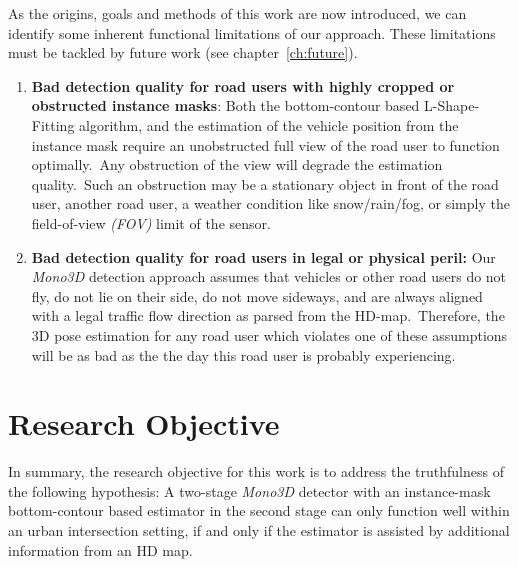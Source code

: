 As the origins, goals and methods of this work are now introduced, we can identify some inherent functional limitations of our approach.
These limitations must be tackled by future work (see chapter~\ref{ch:future}).

\begin{enumerate}
    \item \textbf{Bad detection quality for road users with highly cropped or obstructed instance masks}: Both the bottom-contour based L-Shape-Fitting algorithm, and the estimation of the vehicle position from the instance mask require an unobstructed full view of the road user to function optimally.\ Any obstruction of the view will degrade the estimation quality.\ Such an obstruction may be a stationary object in front of the road user, another road user, a weather condition like snow/rain/fog, or simply the field-of-view \textit{(FOV)} limit of the sensor.
    \item \textbf{Bad detection quality for road users in legal or physical peril:} Our \textit{Mono3D} detection approach assumes that vehicles or other road users do not fly, do not lie on their side, do not move sideways, and are always aligned with a legal traffic flow direction as parsed from the HD-map.\ Therefore, the 3D pose estimation for any road user which violates one of these assumptions will be as bad as the the day this road user is probably experiencing.
\end{enumerate}

\section{Research Objective}
\label{sec:objective}

In summary, the research objective for this work is to address the truthfulness of the following hypothesis: A two-stage \textit{Mono3D} detector with an instance-mask bottom-contour based estimator in the second stage can only function well within an urban intersection setting, if and only if the estimator is assisted by additional information from an HD map.
